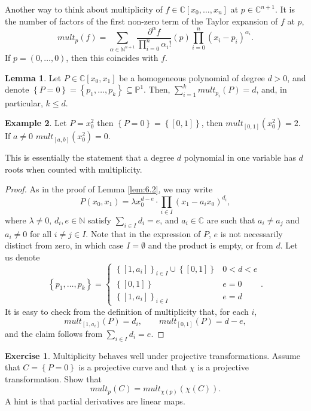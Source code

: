 \documentclass{article}
\newcommand{\N}{\mathbb{N}}
\newcommand{\C}{\mathbb{C}}
\renewcommand{\P}{\mathbb{P}}
\newcommand{\rb}[1]{\left( #1 \right)}
\renewcommand{\sb}[1]{\left[ #1 \right]}
\newcommand{\cb}[1]{\left\{ #1 \right\}}
\theoremstyle{definition}\newtheorem{definition}{Definition}[section]
\theoremstyle{definition}\newtheorem{notation}[definition]{Notation}
\theoremstyle{definition}\newtheorem{remark}[definition]{Remark}
\theoremstyle{definition}\newtheorem{example}[definition]{Example}
\theoremstyle{definition}\newtheorem{fact}{Fact}
\theoremstyle{definition}\newtheorem{exercise}{Exercise}
\newtheorem{lemma}[definition]{Lemma}
\begin{document}
Another way to think about multiplicity of $ f \in \C\sb{x_0, \dots, x_n} $ at $ p \in \C^{n + 1} $. It is the number of factors of the first non-zero term of the Taylor expansion of $ f $ at $ p $,
$$ mult_p\rb{f} = \sum_{\alpha \in \N^{n + 1}} \dfrac{\partial^\alpha f}{\prod_{i = 0}^n \alpha_i!}\rb{p}\prod_{i = 0}^n \rb{x_i - p_i}^{\alpha_i}. $$
If $ p = \rb{0, \dots, 0} $, then this coincides with $ f $.

\begin{lemma}
\label{lem:11.5}
Let $ P \in \C\sb{x_0, x_1} $ be a homogeneous polynomial of degree $ d > 0 $, and denote $ \cb{P = 0} = \cb{p_1, \dots, p_k} \subseteq \P^1 $. Then, $ \sum_{i = 1}^k mult_{p_i}\rb{P} = d $, and, in particular, $ k \le d $.
\end{lemma}

\begin{example}
Let $ P = x_0^2 $ then $ \cb{P = 0} = \cb{\sb{0, 1}} $, then $ mult_{\sb{0, 1}}\rb{x_0^2} = 2 $. If $ a \ne 0 $ $ mult_{\sb{a, b}}\rb{x_0^2} = 0 $.
\end{example}

This is essentially the statement that a degree $ d $ polynomial in one variable has $ d $ roots when counted with multiplicity.

\begin{proof}
As in the proof of Lemma \ref{lem:6.2}, we may write
$$ P\rb{x_0, x_1} = \lambda x_0^{d - e} \cdot \prod_{i \in I} \rb{x_1 - a_ix_0}^{d_i}, $$
where $ \lambda \ne 0 $, $ d_i, e \in \N $ satisfy $ \sum_{i \in I} d_i = e $, and $ a_i \in \C $ are such that $ a_i \ne a_j $ and $ a_i \ne 0 $ for all $ i \ne j \in I $. Note that in the expression of $ P $, $ e $ is not necessarily distinct from zero, in which case $ I = \emptyset $ and the product is empty, or from $ d $. Let us denote
$$ \cb{p_1, \dots, p_k} = \begin{cases} \cb{\sb{1, a_i}}_{i \in I} \cup \cb{\sb{0, 1}} & 0 < d < e \\ \cb{\sb{0, 1}} & e = 0 \\ \cb{\sb{1, a_i}}_{i \in I} & e = d \end{cases}. $$
It is easy to check from the definition of multiplicity that, for each $ i $,
$$ mult_{\sb{1, a_i}}\rb{P} = d_i, \qquad mult_{\sb{0, 1}}\rb{P} = d - e, $$
and the claim follows from $ \sum_{i \in I} d_i = e $.
\end{proof}

\begin{exercise}
\label{ex:32}
Multiplicity behaves well under projective transformations.
Assume that $ C = \cb{P = 0} $ is a projective curve and that $ \chi $ is a projective transformation. Show that
$$ mult_p\rb{C} = mult_{\chi\rb{p}}\rb{\chi\rb{C}}. $$
A hint is that partial derivatives are linear maps.
\end{exercise}
\end{document}
